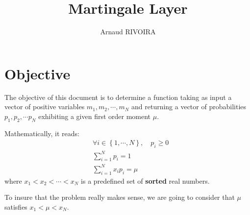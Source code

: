 \documentclass[10pt,a4paper]{article}
\author{Arnaud RIVOIRA}
\title{Martingale Layer}
\begin{document}
\maketitle

\section{Objective}
The objective of this document is to determine a function taking as input a vector of positive variables $m_1, m_2, \cdots, m_N$ and returning a vector of probabilities $p_1, p_2, \cdots p_N$ exhibiting a given first order moment $\mu$.

Mathematically, it reads:
\begin{align}
&\forall i \in \left\lbrace 1, \cdots, N \right\rbrace, \quad p_i \geq 0\\
& \sum_{i=1}^N p_i = 1\\
& \sum_{i=1}^N x_i p_i = \mu
\end{align}
where $x_1 < x_2 < \cdots < x_N$ is a predefined set of \textbf{sorted} real numbers.

To insure that the problem really makes sense, we are going to consider that $\mu$ satisfies $x_1 <\mu < x_N$.
\end{document}

